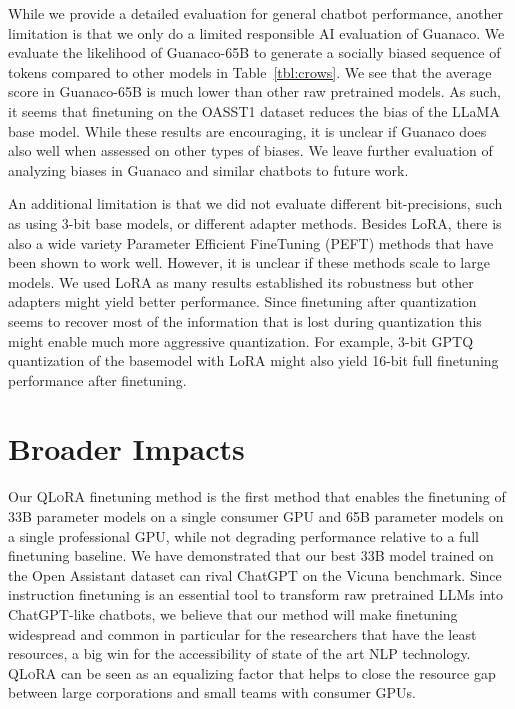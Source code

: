 While we provide a detailed evaluation for general chatbot performance, another limitation is that we only do a limited responsible AI evaluation of {Guanaco}. We evaluate the likelihood of {Guanaco}-65B to generate a socially biased sequence of tokens compared to other models in Table~\ref{tbl:crows}. We see that the average score in {Guanaco}-65B is much lower than other raw pretrained models. As such, it seems that finetuning on the OASST1 dataset reduces the bias of the LLaMA base model. While these results are encouraging, it is unclear if {Guanaco} does also well when assessed on other types of biases. We leave further evaluation of analyzing biases in {Guanaco} and similar chatbots to future work.

An additional limitation is that we did not evaluate different bit-precisions, such as using 3-bit base models, or different adapter methods. Besides LoRA, there is also a wide variety Parameter Efficient FineTuning (PEFT) methods that have been shown to work well. However, it is unclear if these methods scale to large models. We used LoRA as many results established its robustness but other adapters might yield better performance. Since finetuning after quantization seems to recover most of the information that is lost during quantization this might enable much more aggressive quantization. For example, 3-bit GPTQ quantization of the basemodel with LoRA might also yield 16-bit full finetuning performance after finetuning.

\section{Broader Impacts}

Our \textsc{QLoRA} finetuning method is the first method that enables the finetuning of 33B parameter models on a single consumer GPU and 65B parameter models on a single professional GPU, while not degrading performance relative to a full finetuning baseline. We have demonstrated that our best 33B model trained on the Open Assistant dataset can rival ChatGPT on the Vicuna benchmark. Since instruction finetuning is an essential tool to transform raw pretrained LLMs into ChatGPT-like chatbots, we believe that our method will make finetuning widespread and common in particular for the researchers that have the least resources, a big win for the accessibility of state of the art NLP technology. \textsc{QLoRA} can be seen as an equalizing factor that helps to close the resource gap between large corporations and small teams with consumer GPUs.


